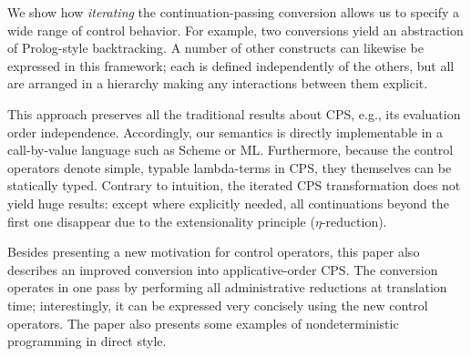 \documentclass[letterpaper]{llncs}
\begin{document}
We show how \textit{iterating} the continuation-passing conversion allows us to specify a wide range of control behavior. For example, two conversions yield an abstraction of Prolog-style backtracking. A number of other constructs can likewise be expressed in this framework; each is defined independently of the others, but all are arranged in a hierarchy making any interactions between them explicit. 

This approach preserves all the traditional results about CPS, e.g., its evaluation order independence. Accordingly, our semantics is directly implementable in a call-by-value language such as Scheme or ML. Furthermore, because the control operators denote simple, typable lambda-terms in CPS, they themselves can be statically typed. Contrary to intuition, the iterated CPS transformation does not yield huge results: except where explicitly needed, all continuations beyond the first one disappear due to the extensionality principle ($\eta$-reduction). 

Besides presenting a new motivation for control operators, this paper also describes an improved conversion into applicative-order CPS. The conversion operates in one pass by performing all administrative reductions at translation time; interestingly, it can be expressed very concisely using the new control operators. The paper also presents some examples of nondeterministic programming in direct style.  









\end{document}
